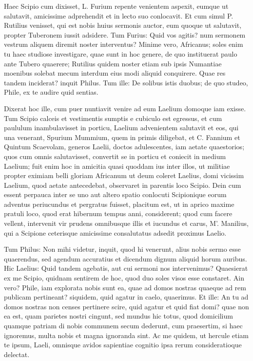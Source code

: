  Haec Scipio cum dixisset, L. Furium repente venientem aspexit, eumque ut salutavit, amicissime adprehendit et in lecto suo conlocavit. Et cum simul P. Rutilius venisset, qui est nobis huius sermonis auctor, eum quoque ut salutavit, propter Tuberonem iussit adsidere. Tum Furius: Quid vos agitis? num sermonem vestrum aliquem diremit noster interventus? Minime vero, Africanus; soles enim tu haec studiose investigare, quae sunt in hoc genere, de quo instituerat paulo ante Tubero quaerere; Rutilius quidem noster etiam sub ipsis Numantiae moenibus solebat mecum interdum eius modi aliquid conquirere. Quae res tandem inciderat? inquit Philus. Tum ille: De solibus istis duobus; de quo studeo, Phile, ex te audire quid sentias.

 Dixerat hoc ille, cum puer nuntiavit venire ad eum Laelium domoque iam exisse. Tum Scipio calceis et vestimentis sumptis e cubiculo est egressus, et cum paululum inambulavisset in porticu, Laelium advenientem salutavit et eos, qui una venerant, Spurium Mummium, quem in primis diligebat, et C. Fannium et Quintum Scaevolam, generos Laelii, doctos adulescentes, iam aetate quaestorios; quos cum omnis salutavisset, convertit se in porticu et coniecit in medium Laelium; fuit enim hoc in amicitia quasi quoddam ius inter illos, ut militiae propter eximiam belli gloriam Africanum ut deum coleret Laelius, domi vicissim Laelium, quod aetate antecedebat, observaret in parentis loco Scipio. Dein cum essent perpauca inter se uno aut altero spatio conlocuti Scipionique eorum adventus periucundus et pergratus fuisset, placitum est, ut in aprico maxime pratuli loco, quod erat hibernum tempus anni, considerent; quod cum facere vellent, intervenit vir prudens omnibusque illis et iucundus et carus, M'. Manilius, qui a Scipione ceterisque amicissime consalutatus adsedit proximus Laelio.

 Tum Philus: Non mihi videtur, inquit, quod hi venerunt, alius nobis sermo esse quaerendus, sed agendum accuratius et dicendum dignum aliquid horum auribus. Hic Laelius: Quid tandem agebatis, aut cui sermoni nos intervenimus? Quaesierat ex me Scipio, quidnam sentirem de hoc, quod duo soles visos esse constaret. Ain vero? Phile, iam explorata nobis sunt ea, quae ad domos nostras quaeque ad rem publicam pertineant? siquidem, quid agatur in caelo, quaerimus. Et ille: An tu ad domos nostras non censes pertinere scire, quid agatur et quid fiat domi? quae non ea est, quam parietes nostri cingunt, sed mundus hic totus, quod domicilium quamque patriam di nobis communem secum dederunt, cum praesertim, si haec ignoremus, multa nobis et magna ignoranda sint. Ac me quidem, ut hercule etiam te ipsum, Laeli, omnisque avidos sapientiae cognitio ipsa rerum consideratioque delectat.

